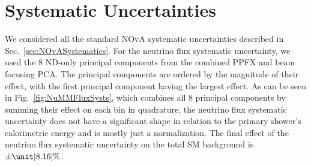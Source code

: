 \section{Systematic Uncertainties}\label{sec:NuMMSystematics}

We considered all the standard \gls{NOvA} systematic uncertainties described in Sec.~\ref{sec:NOvASystematics}. For the neutrino flux systematic uncertainty, we used the 8 \gls{ND}-only principal components from the combined \gls{PPFX} and beam focusing \gls{PCA}. The principal components are ordered by the magnitude of their effect, with the first principal component having the largest effect. As can be seen in Fig.~\ref{fig:NuMMFluxSysts}, which combines all 8 principal components by summing their effect on each bin in quadrature, the neutrino flux systematic uncertainty does not have a significant shape in relation to the primary shower's calorimetric energy and is mostly just a normalization. The final effect of the neutrino flux systematic uncertainty on the total \gls{SM} background is $\pm\unit[8.16]{\%}$.

